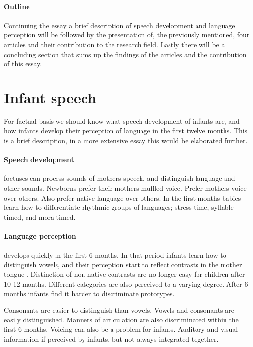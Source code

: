 \documentclass[12pt, a4paper]{article}
\begin{document}
\paragraph{Outline}
Continuing the essay a brief description of speech development and language
perception will be followed by the presentation of, the previously mentioned, 
four articles and their contribution to the research field. Lastly there will
be a concluding section that sums up the findings of the articles and the
contribution of this essay.  

\section{Infant speech}
For factual basis we should know what speech development of infants are, and
how infants develop their perception of language in the first twelve months.
This is a brief description, in a more extensive essay this would be elaborated
further.

\paragraph{Speech development}
foetuses can process sounds of mothers speech, and distinguish language and
other sounds. Newborns prefer their mothers muffled voice. Prefer mothers voice over others.
Also prefer native language over others. In the first months babies learn how to differentiate rhythmic groups of
languages; stress-time, syllable-timed, and mora-timed. \cite{lecture} 

\paragraph{Language perception}
develops quickly in the first 6 months. In that period infants learn how to
distinguish vowels, and their perception start to reflect contrasts in the
mother tongue \cite{lecture}. Distinction of non-native contrasts are no longer
easy for children after 10-12 months. Different categories are also perceived to a varying degree.
After 6 months infants find it harder to discriminate prototypes.

Consonants are easier to distinguish than vowels. Vowels and consonants are
easily distinguished. Manners of articulation are
also discriminated within the first 6 months. Voicing can also be a problem for
infants. Auditory and visual information if perceived by infants, but not
always integrated together. \cite{lecture} 
\end{document}
